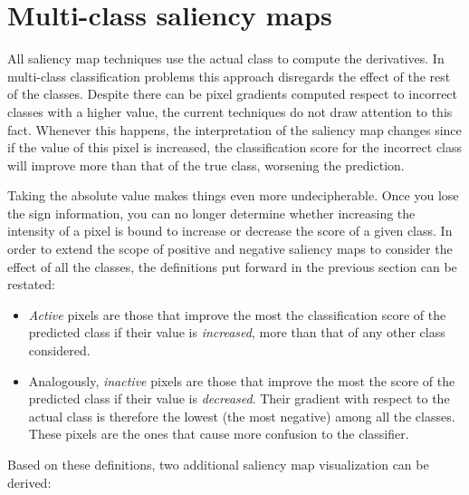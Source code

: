 \documentclass[preprint,12pt]{elsarticle}
\begin{document}
\section{Multi-class saliency maps}
\label{sec:multi_class_saliency_map}
All saliency map techniques use the actual class to compute the derivatives. In multi-class classification problems this approach disregards the effect of the rest of the classes. Despite there can be pixel gradients computed respect to incorrect classes with a higher value, the current techniques do not draw attention to this fact. Whenever this happens, the interpretation of the saliency map changes since if the value of this pixel is increased, the classification score for the incorrect class will improve more than that of the true class, worsening the prediction. 

Taking the absolute value makes things even more undecipherable. Once you lose the sign information, you can no longer determine whether increasing the intensity of a pixel is bound to increase or decrease the score of a given class. In order to extend the scope of positive and negative saliency maps to consider the effect of all the classes, the definitions put forward in the previous section can be restated:
\begin{itemize}
  \item \emph{Active} pixels are those that improve the most the classification score of the predicted class if their value is \emph{increased}, more than that of any other class considered.
    \item Analogously, \emph{inactive} pixels are those that improve the most the score of the predicted class if their value is \emph{decreased}. Their gradient with respect to the actual class is therefore the lowest (the most negative) among all the classes. These pixels are the ones that cause more confusion to the classifier.
\end{itemize}

Based on these definitions, two additional saliency map visualization can be derived:
\end{document}
